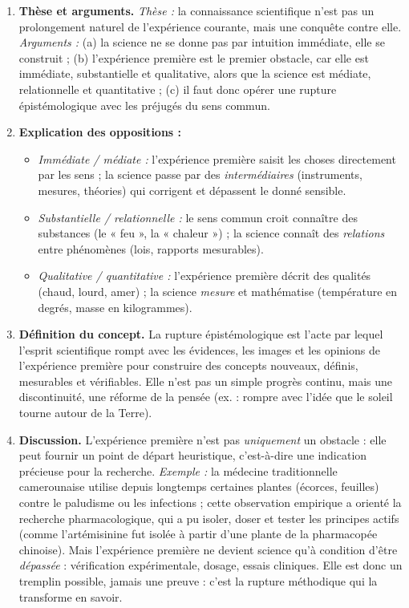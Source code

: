\documentclass[11pt]{article}
\newcommand{\cle}[1]{{\popxbold\color{popdark}#1}}
\begin{document}
\begin{corrige}
\begin{enumerate}
    \item \textbf{Thèse et arguments.} \emph{Thèse :} la connaissance scientifique n'est pas un prolongement naturel de l'expérience courante, mais une \cle{conquête} contre elle. \emph{Arguments :} (a) la science ne se donne pas par intuition immédiate, elle se construit ; (b) l'expérience première est le premier obstacle, car elle est immédiate, substantielle et qualitative, alors que la science est médiate, relationnelle et quantitative ; (c) il faut donc opérer une \cle{rupture épistémologique} avec les préjugés du sens commun.
    \item \textbf{Explication des oppositions :}
    \begin{itemize}
        \item \emph{Immédiate / médiate :} l'expérience première saisit les choses directement par les sens ; la science passe par des \emph{intermédiaires} (instruments, mesures, théories) qui corrigent et dépassent le donné sensible.
        \item \emph{Substantielle / relationnelle :} le sens commun croit connaître des substances (le « feu », la « chaleur ») ; la science connaît des \emph{relations} entre phénomènes (lois, rapports mesurables).
        \item \emph{Qualitative / quantitative :} l'expérience première décrit des qualités (chaud, lourd, amer) ; la science \emph{mesure} et mathématise (température en degrés, masse en kilogrammes).
    \end{itemize}
    \item \textbf{Définition du concept.} La \cle{rupture épistémologique} est l'acte par lequel l'esprit scientifique rompt avec les évidences, les images et les opinions de l'expérience première pour construire des concepts nouveaux, définis, mesurables et vérifiables. Elle n'est pas un simple progrès continu, mais une discontinuité, une réforme de la pensée (ex. : rompre avec l'idée que le soleil tourne autour de la Terre).
    \item \textbf{Discussion.} L'expérience première n'est pas \emph{uniquement} un obstacle : elle peut fournir un \cle{point de départ heuristique}, c'est-à-dire une indication précieuse pour la recherche. \emph{Exemple :} la médecine traditionnelle camerounaise utilise depuis longtemps certaines plantes (écorces, feuilles) contre le paludisme ou les infections ; cette observation empirique a orienté la recherche \cle{pharmacologique}, qui a pu isoler, doser et tester les principes actifs (comme l'artémisinine fut isolée à partir d'une plante de la pharmacopée chinoise). Mais l'expérience première ne devient science qu'à condition d'être \emph{dépassée} : vérification expérimentale, dosage, essais cliniques. Elle est donc un tremplin possible, jamais une preuve : c'est la rupture méthodique qui la transforme en savoir.

\end{enumerate}
\end{corrige}
\end{document}
